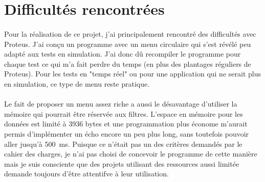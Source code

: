 \documentclass{article}
\begin{document}
    \section{Difficultés rencontrées}
    \paragraph{}
    Pour la réalisation de ce projet, j'ai principalement rencontré des difficultés avec Proteus. J'ai conçu un programme avec un menu circulaire qui s'est révélé peu adapté aux tests en simulation. J'ai donc dû recompiler le programme pour chaque test ce qui m'a fait perdre du temps (en plus des plantages réguliers de Proteus). Pour les tests en "temps réel" ou pour une application qui ne serait plus en simulation, ce type de menu reste pratique.

    \paragraph{}
    Le fait de proposer un menu assez riche a aussi le désavantage d'utiliser la mémoire qui pourrait être réservée aux filtres. L'espace en mémoire pour les données est limité à 3936 bytes et une programmation plus économe m'aurait permis d'implémenter un écho encore un peu plus long, sans toutefois pouvoir aller jusqu'à \SI{500}{\milli\second}. Puisque ce n'était pas un des critères demandés par le cahier des charges, je n'ai pas choisi de concevoir le programme de cette manière mais je suis consciente que des projets utilisant des ressources aussi limitée demande toujours d'être attentif\textperiodcentered ve à leur utilisation.
\end{document}
